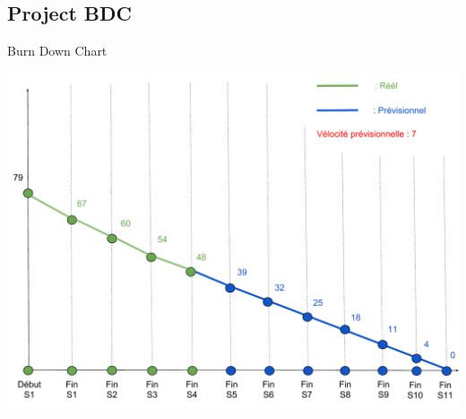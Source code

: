 \documentclass{beamer}
\begin{document}
\subsection{Project BDC}

\begin{frame}{Burn Down Chart}
	\begin{center}
        \includegraphics[scale=0.35]{BDC.pdf}
        \end{center}
\end{frame}
\end{document}
